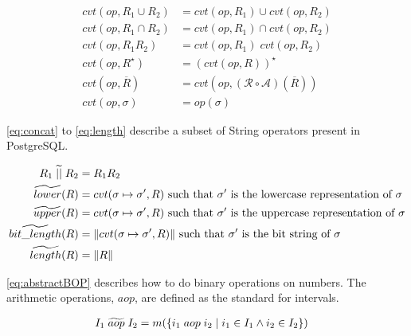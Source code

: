 \begin{align}
    cvt(op, R_1 \cup R_2) &= cvt(op, R_1) \cup cvt(op, R_2) \\
    cvt(op, R_1 \cap R_2) &= cvt(op, R_1) \cap cvt(op, R_2) \\
    cvt(op, R_1R_2) &= cvt(op, R_1) \; cvt(op, R_2) \\
    cvt(op, R^\star) &= (cvt(op, R))^\star \\
    cvt(op, \overline{R}) &= cvt(op, (\mathcal{R} \circ \mathcal{A}) (\overline{R})) \\ \label{eq:complement}
    cvt(op, \sigma) &= op(\sigma)
\end{align}

\autoref{eq:concat} to \ref{eq:length} describe a subset of String operators present in PostgreSQL.

\begin{align}\label{eq:concat}
    R_1 \;\aab{||}\; R_2 &= R_1R_2 \\
    \aab{lower}(R) &= cvt(\sigma \mapsto \sigma', R) \text{ such that $\sigma'$ is the lowercase representation of $\sigma$}\\
    \aab{upper}(R) &= cvt(\sigma \mapsto \sigma', R) \text{ such that $\sigma'$ is the uppercase representation of $\sigma$}\\
    \aab{bit\_length}(R) &= \|cvt(\sigma \mapsto \sigma', R)\| \text{ such that $\sigma'$ is the bit string of $\sigma$} \\ \label{eq:length}
    \aab{length}(R) &= \|R\|
\end{align}

\autoref{eq:abstractBOP} describes how to do binary operations on numbers.
The arithmetic operations, $aop$, are defined as the standard for intervals.

\begin{align}
    I_1 \;\aab{aop}\; I_2 &= m(\{i_1 \; aop \; i_2 \mid i_1 \in I_1 \land i_2 \in I_2\})  \label{eq:abstractBOP}
\end{align}

